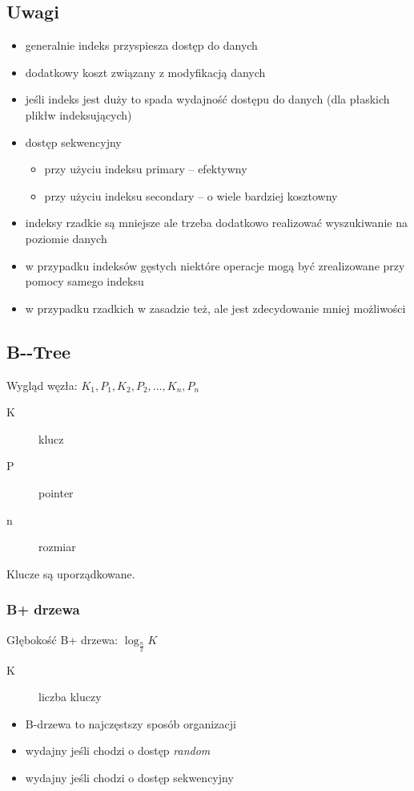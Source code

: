 \documentclass[12pt]{article}
\begin{document}
\subsection{Uwagi}
\begin{itemize}
\item generalnie indeks przyspiesza dostęp do danych
\item dodatkowy koszt związany z modyfikacją danych
\item jeśli indeks jest duży to spada wydajność dostępu do danych (dla płaskich plikłw indeksujących)
\item dostęp sekwencyjny
\begin{itemize}
\item przy użyciu indeksu primary -- efektywny
\item przy użyciu indeksu secondary -- o wiele bardziej kosztowny
\end{itemize}
\item indeksy rzadkie są mniejsze ale trzeba dodatkowo realizować wyszukiwanie na poziomie danych
\item w przypadku indeksów gęstych niektóre operacje mogą być zrealizowane przy pomocy samego indeksu
\item w przypadku rzadkich w zasadzie też, ale jest zdecydowanie mniej możliwości
\end{itemize}

\subsection{\ac{B--Tree}}
Wygląd węzła: $ K_1, P_1, K_2, P_2, \ldots, K_n, P_n $
\begin{description}
\item[K] klucz
\item[P] pointer
\item[n] rozmiar
\end{description}
Klucze są uporządkowane.

\subsubsection{B+ drzewa}
Głębokość B+ drzewa: $ \log_{\frac{n}{2}}{K} $
\begin{description}
\item[K] liczba kluczy
\end{description}

\begin{itemize}
\item B-drzewa to najczęstszy sposób organizacji
\item wydajny jeśli chodzi o dostęp \emph{random}
\item wydajny jeśli chodzi o dostęp sekwencyjny
\end{itemize}
\end{document}

